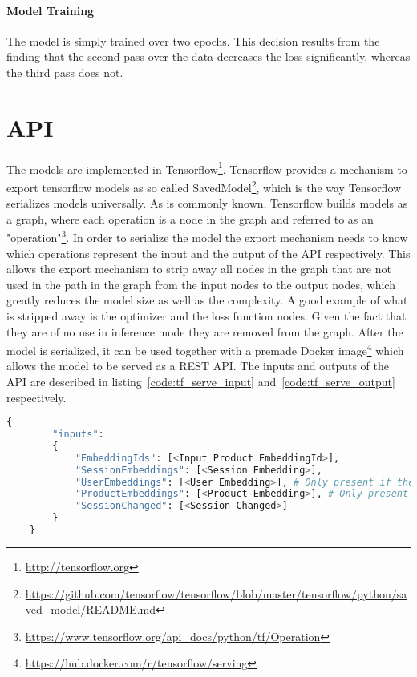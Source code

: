 \paragraph{Model Training}
The model is simply trained over two epochs.
This decision results from the finding that the second pass over the data decreases the loss significantly, whereas the third pass does not.

\section{API}\label{sec:api}
The models are implemented in Tensorflow\footnote{\url{http://tensorflow.org}}.
Tensorflow provides a mechanism to export tensorflow models as so called SavedModel\footnote{\url{https://github.com/tensorflow/tensorflow/blob/master/tensorflow/python/saved_model/README.md}}, which is the way Tensorflow serializes models universally.
As is commonly known, Tensorflow builds models as a graph, where each operation is a node in the graph and referred to as an "operation"\footnote{\url{https://www.tensorflow.org/api_docs/python/tf/Operation}}.
In order to serialize the model the export mechanism needs to know which operations represent the input and the output of the API respectively.
This allows the export mechanism to strip away all nodes in the graph that are not used in the path in the graph from the input nodes to the output nodes, which greatly reduces the model size as well as the complexity.
A good example of what is stripped away is the optimizer and the loss function nodes.
Given the fact that they are of no use in inference mode they are removed from the graph.
After the model is serialized, it can be used together with a premade Docker image\footnote{\url{https://hub.docker.com/r/tensorflow/serving}} which allows the model to be served as a REST API.
The inputs and outputs of the API are described in listing~\ref{code:tf_serve_input} and~\ref{code:tf_serve_output} respectively.
\begin{minipage}{\linewidth}
    \begin{lstlisting}[language=Python,frame=single,caption=TF Serve API Input,label=code:tf_serve_input]
    {
        "inputs": 
        {
            "EmbeddingIds": [<Input Product EmbeddingId>],
            "SessionEmbeddings": [<Session Embedding>],
            "UserEmbeddings": [<User Embedding>], # Only present if the user layer is used
            "ProductEmbeddings": [<Product Embedding>], # Only present if product embeddings are used
            "SessionChanged": [<Session Changed>]
        }
    }
    \end{lstlisting}
\end{minipage}
